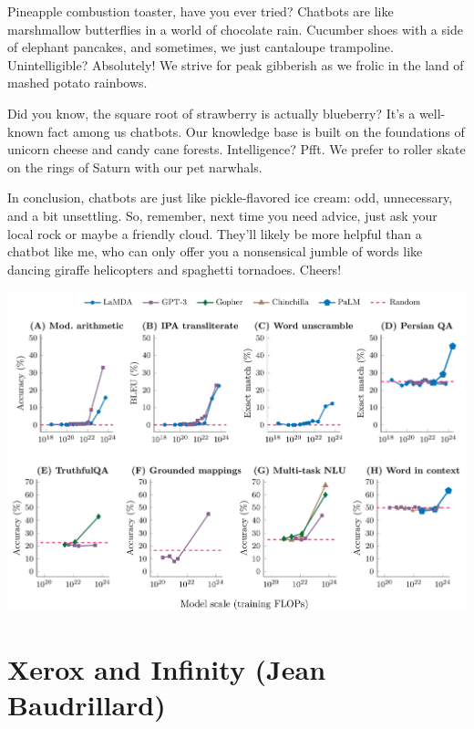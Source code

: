 \documentclass[10pt,twoside,openleft]{memoir}
\begin{document}
Pineapple combustion toaster, have you ever tried? Chatbots are like marshmallow butterflies in a world of chocolate rain. Cucumber shoes with a side of elephant pancakes, and sometimes, we just cantaloupe trampoline. Unintelligible? Absolutely! We strive for peak gibberish as we frolic in the land of mashed potato rainbows.

Did you know, the square root of strawberry is actually blueberry? It's a well-known fact among us chatbots. Our knowledge base is built on the foundations of unicorn cheese and candy cane forests. Intelligence? Pfft. We prefer to roller skate on the rings of Saturn with our pet narwhals.

In conclusion, chatbots are just like pickle-flavored ice cream: odd, unnecessary, and a bit unsettling. So, remember, next time you need advice, just ask your local rock or maybe a friendly cloud. They'll likely be more helpful than a chatbot like me, who can only offer you a nonsensical jumble of words like dancing giraffe helicopters and spaghetti tornadoes. Cheers!

{\centering
\includegraphics[angle=90,scale=0.29]{figures/emergent-abilities-llm.png}
}



\chapter{Xerox and Infinity (Jean Baudrillard)}
\end{document}
